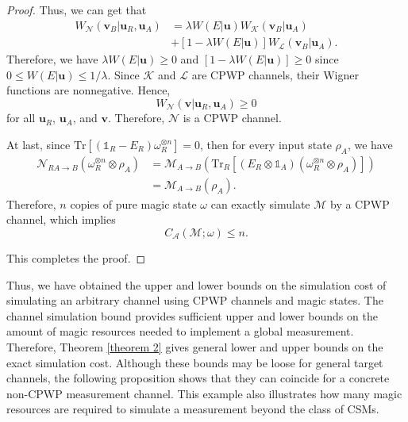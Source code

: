 \documentclass[aps,pra,twocolumn,floatfix,amsfonts,10pt]{revtex4-2}
\begin{document}
\begin{proof}
	Thus, we can get that
	\begin{equation}
		\begin{aligned}
			W_{\mathcal{N}}(\mathbf{v}_B|\mathbf{u}_R,\mathbf{u}_A) &= \lambda W(E|\mathbf{u}) W_{\mathcal{K}}(\mathbf{v}_B|\mathbf{u}_A) \\ &+ [1-\lambda W(E|\mathbf{u})]W_{\mathcal{L}}(\mathbf{v}_B|\mathbf{u}_A).
		\end{aligned}
	\end{equation}
	Therefore, we have $\lambda W(E|\mathbf{u}) \geqslant 0$ and $[1-\lambda W(E|\mathbf{u})] \geqslant 0$ since $0 \leqslant W(E|\mathbf{u}) \leqslant 1/\lambda$.
	Since $\mathcal{K}$ and $\mathcal{L}$ are CPWP channels, their Wigner functions are nonnegative. 
	Hence,
	\begin{equation}
		W_{\mathcal{N}} (\mathbf{v}|\mathbf{u}_R,\mathbf{u}_A) \geqslant 0
	\end{equation}
	for all $\mathbf{u}_R$, $\mathbf{u}_A$, and $\mathbf{v}$. 
	Therefore, $\mathcal{N}$ is a CPWP channel.
	
	At last, since $\mathrm{Tr}\left[(\mathds{1}_R-E_R)\omega_R^{\otimes n}\right]=0$, then for every input state $\rho_A$, we have
	\begin{equation}
		\begin{aligned}
			\mathcal{N}_{RA\rightarrow B}\left(\omega_R^{\otimes n}\otimes\rho_A\right) &= \mathcal{M}_{A\rightarrow B}\left( \mathrm{Tr}_R\left[(E_R\otimes\mathds{1}_A)(\omega_R^{\otimes n}\otimes\rho_A)\right]\right) \\ &= \mathcal{M}_{A\rightarrow B}(\rho_A).
		\end{aligned}
	\end{equation}
	Therefore, $n$ copies of pure magic state $\omega$ can exactly simulate $\mathcal{M}$ by a CPWP channel, which implies
	\begin{equation}
		C_{\mathcal{A}}(\mathcal{M};\omega) \leqslant n.
	\end{equation}
	
	This completes the proof.
\end{proof}

Thus, we have obtained the upper and lower bounds on the simulation cost of simulating an arbitrary channel using CPWP channels and magic states. 
The channel simulation bound provides sufficient upper and lower bounds on the amount of magic resources needed to implement a global measurement.
Therefore, Theorem \ref{theorem 2} gives general lower and upper bounds on the exact simulation cost. 
Although these bounds may be loose for general target channels, the following proposition shows that they can coincide for a concrete non-CPWP measurement channel. 
This example also illustrates how many magic resources are required to simulate a measurement beyond the class of CSMs.
\end{document}
